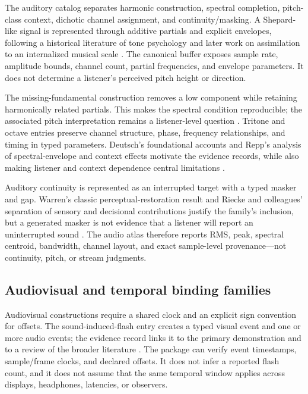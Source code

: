 \documentclass[
  english,
]{article}
\begin{document}
The auditory catalog separates harmonic construction, spectral
completion, pitch-class context, dichotic channel assignment, and
continuity/masking. A Shepard-like signal is represented through
additive partials and explicit envelopes, following a historical
literature of tone psychology and later work on assimilation to an
internalized musical scale
\citep{stumpf1883tonpsychology, shepard1984scale}. The canonical buffer
exposes sample rate, amplitude bounds, channel count, partial
frequencies, and envelope parameters. It does not determine a listener's
perceived pitch height or direction.

The missing-fundamental construction removes a low component while
retaining harmonically related partials. This makes the spectral
condition reproducible; the associated pitch interpretation remains a
listener-level question \citep{zatorre2005missing}. Tritone and octave
entries preserve channel structure, phase, frequency relationships, and
timing in typed parameters. Deutsch's foundational accounts and Repp's
analysis of spectral-envelope and context effects motivate the evidence
records, while also making listener and context dependence central
limitations
\citep{deutsch1986tritone, repp1997tritone, deutsch1974octave}.

Auditory continuity is represented as an interrupted target with a typed
masker and gap. Warren's classic perceptual-restoration result and
Riecke and colleagues' separation of sensory and decisional
contributions justify the family's inclusion, but a generated masker is
not evidence that a listener will report an uninterrupted sound
\citep{warren1970continuity, riecke2011continuity}. The audio atlas
therefore reports RMS, peak, spectral centroid, bandwidth, channel
layout, and exact sample-level provenance---not continuity, pitch, or
stream judgments.

\subsection{Audiovisual and temporal binding
families}\label{audiovisual-and-temporal-binding-families}

Audiovisual constructions require a shared clock and an explicit sign
convention for offsets. The sound-induced-flash entry creates a typed
visual event and one or more audio events; the evidence record links it
to the primary demonstration and to a review of the broader literature
\citep{shams2000sifi, hirst2020sound}. The package can verify event
timestamps, sample/frame clocks, and declared offsets. It does not infer
a reported flash count, and it does not assume that the same temporal
window applies across displays, headphones, latencies, or observers.
\end{document}
